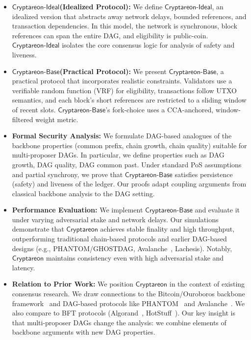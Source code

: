 \documentclass[11pt]{article}
\newcommand{\mnote}[1]{{\color{red}{\it [{\bf Marcin:} #1]}}}
\newcommand{\Proj}{\ensuremath{\mathsf{Cryptareon}}\xspace}
\newcommand{\ProjIdeal}{\ensuremath{\mathsf{Cryptareon\text{-}Ideal}}\xspace}
\newcommand{\ProjBase}{\ensuremath{\mathsf{Cryptareon\text{-}Base}}\xspace}
\begin{document}
\begin{itemize}
\item {\bf \ProjIdeal (Idealized Protocol):} We define \ProjIdeal, an idealized version that abstracts away network delays, bounded references, and transaction dependencies. In this model, the network is synchronous, block references can span the entire DAG, and eligibility is \mnote{'a' missing?} public-coin. \ProjIdeal isolates the core consensus logic for analysis of safety and liveness.
\item {\bf \ProjBase (Practical Protocol):} We present \ProjBase, a practical protocol that incorporates realistic constraints. Validators use a verifiable random function (VRF) for eligibility, transactions follow UTXO semantics, and each block's short references are restricted to a sliding window of recent slots. %
\ProjBase's fork-choice uses a CCA-anchored, window-filtered weight metric.
\item {\bf Formal Security Analysis:} We formulate DAG-based analogues of the backbone properties (common prefix, chain growth, chain quality) suitable for multi-proposer DAGs. In particular, we define properties such as DAG growth, DAG quality, DAG common past. %
Under standard PoS assumptions and partial synchrony, we prove that \ProjBase satisfies persistence (safety) and liveness of the ledger. Our proofs adapt coupling arguments from classical backbone analysis to the DAG setting.
\item {\bf Performance Evaluation:} We implement \ProjBase and evaluate it under varying adversarial stake and network delays. Our simulations demonstrate that \Proj achieves stable finality and high throughput, outperforming traditional chain-based protocols and earlier DAG-based designs (e.g., PHANTOM/GHOSTDAG, Avalanche~\cite{SnowFamily}, Lachesis). Notably, \Proj maintains consistency even with high adversarial stake and latency.
\item {\bf Relation to Prior Work:} We position \Proj in the context of existing consensus research. We draw connections to the Bitcoin/Ouroboros backbone framework~\cite{EC:GarKiaLeo15,EC:PasSeeShe17} and DAG-based protocols like PHANTOM~\cite{AFT:SWZ21} and Avalanche~\cite{SnowFamily}. We also compare to BFT protocols (Algorand~\cite{Algorand}, HotStuff~\cite{HotStuff}). Our key insight is that multi-proposer DAGs change the analysis: we combine elements of backbone arguments with new DAG properties.
\end{itemize}
\end{document}
